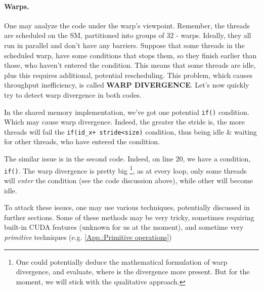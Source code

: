 \paragraph*{Warps.} One may analyze the code under the warp's viewpoint. Remember, the threads are scheduled 
on the SM, partitioned into groups of 32 - warps. Ideally, they all run in parallel and don't have any 
barriers. Suppose that some threads in the scheduled warp, have some conditions that stops them, so they finish earlier than 
those, who haven't entered the condition. This means that some threads are idle, plus this requires additional, potential 
rescheduling. This problem, which causes throughput inefficiency, is called \textbf{WARP DIVERGENCE}. 
Let's now quickly try to detect warp divergence in both codes. 

In the shared memory implementation, we've got one potential
\verb|if()| condition. Which may cause warp divergence. Indeed, the greater the stride is, 
the more threads will fail the \verb|if(id_x+ stride<size)| condition, thus being idle \& waiting for other threads, who have entered the condition.


The similar issue is in the second code. Indeed, on line  $20$, we have a condition, \verb|if()|. 
The warp divergence is pretty big \footnote{One could potentially deduce the mathematical formulation of warp divergence, 
and evaluate, where is the divergence more present. But for the moment, we will stick with the qualitative approach.}, as 
at every loop, only some threads will \textit{enter} the condition (see the code discussion above), while other will become 
idle. 

To attack these issues, one may use various techniques, potentially discussed in further sections. 
Some of these methods may be very tricky, sometimes requiring built-in CUDA features (unknown for us at the moment), and 
sometime very \textit{primitive} techniques (e.g. \autoref{App.:Primitive operations})

